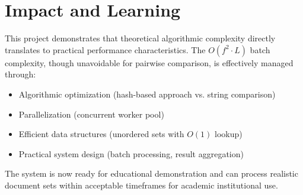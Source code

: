 \documentclass[12pt,oneside,openany]{report}
\begin{document}
\section{Impact and Learning}

This project demonstrates that theoretical algorithmic complexity directly translates to practical performance characteristics. The $O(f^2 \cdot L)$ batch complexity, though unavoidable for pairwise comparison, is effectively managed through:
\begin{itemize}
  \item Algorithmic optimization (hash-based approach vs. string comparison)
  \item Parallelization (concurrent worker pool)
  \item Efficient data structures (unordered sets with $O(1)$ lookup)
  \item Practical system design (batch processing, result aggregation)
\end{itemize}

The system is now ready for educational demonstration and can process realistic document sets within acceptable timeframes for academic institutional use.
\end{document}
